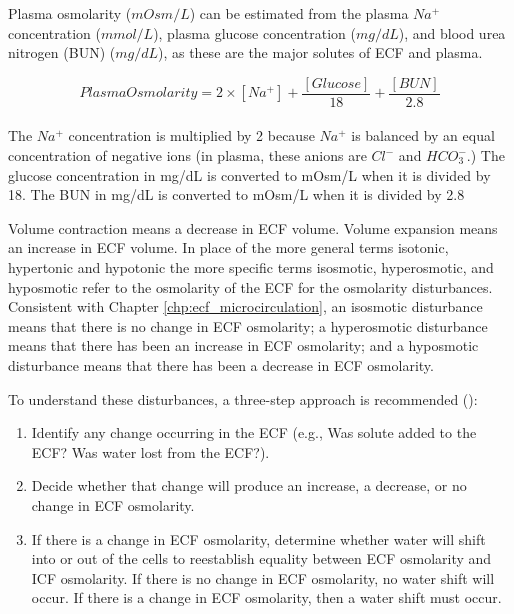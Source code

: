 Plasma osmolarity ($mOsm/L$) can be estimated from the plasma $Na^+$ concentration ($mmol/L$), plasma glucose concentration ($mg/dL$), and blood urea nitrogen (BUN) ($mg/dL$), as these are the major solutes of ECF and plasma. 

\begin{equation}
Plasma Osmolarity = 2 \times [Na^+] + \frac{[Glucose]}{18} +\frac{[BUN]}{2.8}
\label{osmolarity}
\end{equation}
\paragraph{}
The $Na^+$ concentration is multiplied by 2 because $Na^+$ is balanced by an equal concentration of negative ions (in plasma, these anions are $Cl^-$ and $HCO_3^-$.) The glucose concentration in mg/dL is converted to mOsm/L when it is divided by 18. The BUN in mg/dL is converted to mOsm/L when it is divided by 2.8

Volume contraction means a decrease in ECF volume. Volume expansion means an increase in ECF volume. In place of the more general terms isotonic, hypertonic and hypotonic the more specific terms isosmotic, hyperosmotic, and hyposmotic refer to the osmolarity of the ECF for the osmolarity disturbances. Consistent with Chapter \ref{chp:ecf_microcirculation}, an isosmotic disturbance means that there is no change in ECF osmolarity; a hyperosmotic disturbance means that there has been an increase in ECF osmolarity; and a hyposmotic disturbance means that there has been a decrease in ECF osmolarity. 

To understand these disturbances, a three-step approach is recommended (\cite{costanzo_physiology_2013}):

\begin{enumerate}
\item Identify any change occurring in the ECF (e.g., Was solute added to the ECF? Was water lost from the ECF?).
\item Decide whether that change will produce an increase, a decrease, or no change in ECF osmolarity. 
\item If there is a change in ECF osmolarity, determine whether water will shift into or out of the cells to reestablish equality between ECF osmolarity and ICF osmolarity. If there is no change in ECF osmolarity, no water shift will occur. If there is a change in ECF osmolarity, then a water shift must occur. 
\end{enumerate}

